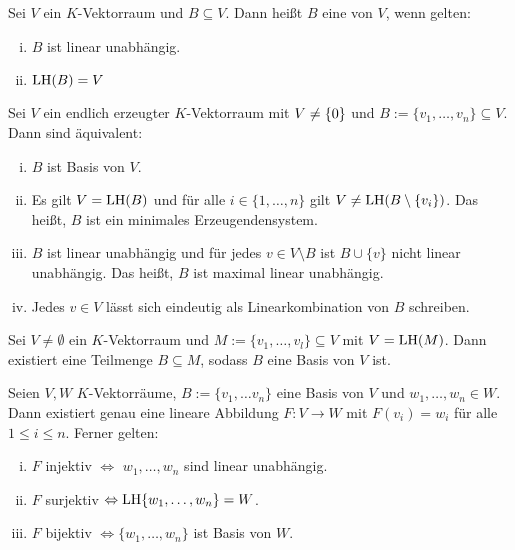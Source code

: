 \begin{definition}[Basis]
	\label{def:I.8.10}
	Sei $V$ ein $K$-Vektorraum und $B \subseteq V$.
	Dann heißt $B$ eine  von $V$, wenn gelten:
	\begin{enumerate}[(i)]
		\item $B$ ist linear unabhängig.
		\item $\operatorname{LH}(B) = V$
	\end{enumerate}
\end{definition}

\setcounter{satz}{11}
\begin{satz}
	\label{satz:I.8.12}
	Sei $V$ ein endlich erzeugter $K$-Vektorraum mit $V \neq \{0\}$ und $B := \{v_1,\dots,v_n\} \subseteq V$.
	Dann sind äquivalent:
	\begin{enumerate}[(i)]
		\item $B$ ist Basis von $V$.
		\item Es gilt $V = \operatorname{LH}(B)$ und für alle $i \in \{1,\dots,n\}$ gilt $V \neq \operatorname{LH}(B \setminus \{v_i\})$.
		Das heißt, $B$ ist ein minimales Erzeugendensystem.
		\item $B$ ist linear unabhängig und für jedes $v \in V \setminus B$ ist $B \cup \{v\}$ nicht linear unabhängig.
		Das heißt, $B$ ist maximal linear unabhängig.
		\item Jedes $v \in V$ lässt sich eindeutig als Linearkombination von $B$ schreiben.
	\end{enumerate}
\end{satz}

\begin{satz}[Basisauswahlsatz]
	\label{satz:I.8.13}
	Sei $V \neq \emptyset$ ein $K$-Vektorraum und $M := \{v_1,\dots,v_l\} \subseteq V$ mit $V = \operatorname{LH}(M)$.
	Dann existiert eine Teilmenge $B \subseteq M$, sodass $B$ eine Basis von $V$ ist.
\end{satz}

\setcounter{satz}{14}
\begin{satz}
	\label{satz:I.8.15}
	Seien $V,W$ $K$-Vektorräume, $B := \{v_1,\dots v_n\}$ eine Basis von $V$ und $w_1,\dots,w_n \in W$.
	Dann existiert genau eine lineare Abbildung $F \colon V \rightarrow W$ mit $F(v_i) = w_i$ für alle $1 \leq i \leq n$.
	Ferner gelten:
	\begin{enumerate}[(i)]
		\item $F$ injektiv $\Leftrightarrow$ $w_1,\dots, w_n$ sind linear unabhängig.
		\item $F$ surjektiv $\Leftrightarrow \operatorname{LH}\{w_1,\dots,w_n\} = W$.
		\item $F$ bijektiv $\Leftrightarrow \{w_1,\dots,w_n\}$ ist Basis von $W$.
	\end{enumerate}
\end{satz}

